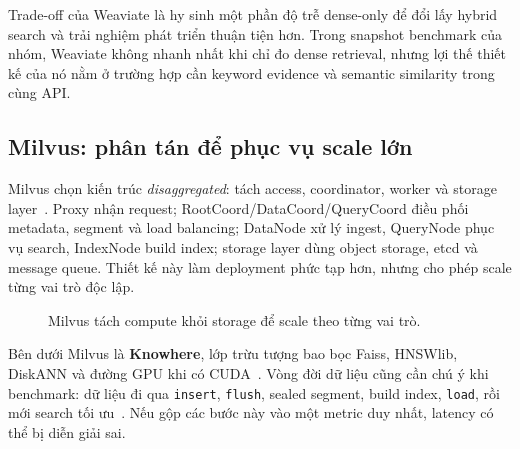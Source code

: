 Trade-off của Weaviate là hy sinh một phần độ trễ dense-only để đổi lấy hybrid search và trải nghiệm phát triển thuận tiện hơn. Trong snapshot benchmark của nhóm, Weaviate không nhanh nhất khi chỉ đo dense retrieval, nhưng lợi thế thiết kế của nó nằm ở trường hợp cần keyword evidence và semantic similarity trong cùng API.

\subsection{Milvus: phân tán để phục vụ scale lớn}
\label{sec:milvus}

Milvus chọn kiến trúc \textit{disaggregated}: tách access, coordinator, worker và storage layer~\cite{wang2021milvus,milvusarch}. Proxy nhận request; RootCoord/DataCoord/QueryCoord điều phối metadata, segment và load balancing; DataNode xử lý ingest, QueryNode phục vụ search, IndexNode build index; storage layer dùng object storage, etcd và message queue. Thiết kế này làm deployment phức tạp hơn, nhưng cho phép scale từng vai trò độc lập.

\begin{figure}[H]
\centering
{}
\caption{Milvus tách compute khỏi storage để scale theo từng vai trò.}
\label{fig:milvus-arch}
\end{figure}

Bên dưới Milvus là \textbf{Knowhere}, lớp trừu tượng bao bọc Faiss, HNSWlib, DiskANN và đường GPU khi có CUDA~\cite{milvusknowheredocs,milvusdiskann,subramanya2019diskann}. Vòng đời dữ liệu cũng cần chú ý khi benchmark: dữ liệu đi qua \texttt{insert}, \texttt{flush}, sealed segment, build index, \texttt{load}, rồi mới search tối ưu~\cite{milvusdocs}. Nếu gộp các bước này vào một metric duy nhất, latency có thể bị diễn giải sai.

